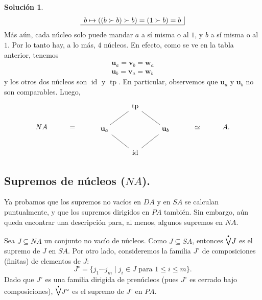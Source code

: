 \documentclass[12pt,letterpaper,titlepage]{article}
\theoremstyle{definition}
\newtheorem*{sol}{Solución}
\newcommand\pSup{%
    {\stackrel{\raisebox{-3pt}{\scalebox{0.5}{$\bullet$}}}{\bigvee}}
  }%
\newcommand\unuc[1]{\mathbf u_{#1}}
\newcommand\vnuc[1]{\mathbf v_{#1}}
\newcommand\wnuc[1]{\mathbf w_{#1}}
\newcommand\tps[1]{\texorpdfstring{#1}{}}
\newcommand\<{\langle}
\renewcommand\>{\rangle}
\DeclareMathOperator{\id}{id}
\DeclareMathOperator{\tp}{tp}
\begin{document}
\begin{sol}
\[\begin{array}{c|}
            b\mapsto ((b\succ b)\succ b) = (1\succ b) = b \\
            \hline
        \end{array}
    \]
    Más aún, cada núcleo solo puede mandar $a$ a sí misma
    o al $1$, y $b$ a sí misma o al $1$.
    Por lo tanto hay, a lo más, $4$ núcleos.
    En efecto, como se ve en la tabla anterior, tenemos
    \begin{align*}
        \unuc a = \vnuc b = \wnuc a \\
        \unuc b = \vnuc a = \wnuc b
    \end{align*}
    y los otros dos núcleos son $\id$ y $\tp$.
    En particular, observemos que $\unuc a$ y $\unuc b$ no son
    comparables.
    Luego, 
  \[
    NA\hspace{10mm} = \hspace{10mm}
    \begin{tikzcd}
      & \tp \\
      \unuc a \ar[ur,no head] && \unuc b \ar[ul,no head] \\
      & \id \ar[ur,no head] \ar[ul,no head]
    \end{tikzcd}
    \hspace{10mm} \simeq \hspace{10mm} A
  .\]
\end{sol}


\subsection{Supremos de núcleos \tps{($NA$)}.}

Ya probamos que los supremos no vacíos en $DA$ y en $SA$ se
calculan puntualmente, y que los supremos dirigidos en $PA$
también.
Sin embargo, aún queda encontrar una descripción para, al menos,
algunos supremos en $NA$.

Sea $J\subseteq NA$ un conjunto no vacío de núcleos.
Como $J\subseteq SA$, entonces $\pSup J$ es el supremo de $J$ en
$SA$.
Por otro lado, consideremos la familia $J^\circ$
de composiciones (finitas) de elementos de $J$:
\[
  J^\circ = \{j_1\cdots j_m \mid j_i\in J \text{ para } 1\leq
  i\leq m\}
.\]
Dado que $J^\circ$ es una familia dirigida de prenúcleos
(pues $J^\circ$ es cerrado bajo composiciones), $\pSup J^\circ$
es el supremo de $J^\circ$ en $PA$.
\end{document}
